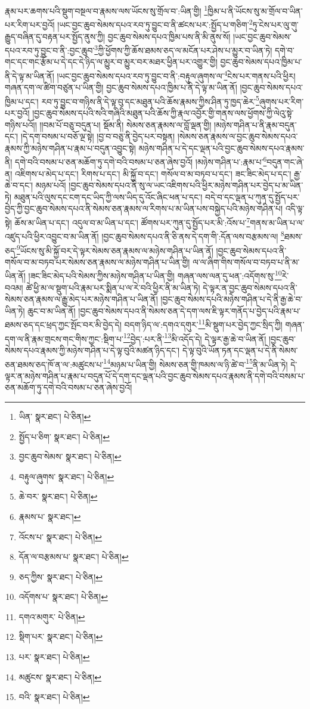 རྣམ་པར་ཆགས་པའི་སྡུག་བསྔལ་བ་རྣམས་ལས་ཡོངས་སུ་གྲོལ་བ་:ཡིན་གྱི། \footnote{ཡིན་  སྣར་ཐང་།  པེ་ཅིན། }ཁྱིམ་པ་ནི་ཡོངས་སུ་མ་གྲོལ་བ་ཡིན་པར་རིག་པར་བྱའོ། །ཡང་བྱང་ཆུབ་སེམས་དཔའ་རབ་ཏུ་བྱུང་བ་ནི་ཚངས་པར་:སྤྱོད་པ་གཅིག་\footnote{སྤྱོད་པ་ཅིག་  སྣར་ཐང་།  པེ་ཅིན། }ཏུ་ངེས་པར་ལུ་གུ་རྒྱུད་བཞིན་དུ་བརྟན་པར་སྤྱོད་ནུས་ཀྱི། བྱང་ཆུབ་སེམས་དཔའ་ཁྱིམ་པས་ནི་མི་ནུས་སོ། །ཡང་བྱང་ཆུབ་སེམས་དཔའ་རབ་ཏུ་བྱུང་བ་ནི་:བྱང་ཆུབ་\footnote{བྱང་ཆུབ་སེམས་  སྣར་ཐང་།  པེ་ཅིན། }ཀྱི་ཕྱོགས་ཀྱི་ཆོས་ཐམས་ཅད་ལ་མངོན་པར་ཤེས་པ་མྱུར་བ་ཡིན་ཏེ། དགེ་བ་གང་དང་གང་རྩོམ་པ་དེ་དང་དེ་ཉིད་ལ་མྱུར་བ་མྱུར་བར་མཐར་ཕྱིན་པར་འགྱུར་གྱི། བྱང་ཆུབ་སེམས་དཔའ་ཁྱིམ་པ་ནི་དེ་ལྟ་མ་ཡིན་ནོ། །ཡང་བྱང་ཆུབ་སེམས་དཔའ་རབ་ཏུ་བྱུང་བ་ནི་:བརྟུལ་ཞུགས་ལ་\footnote{བརྟུལ་ཞུགས་  སྣར་ཐང་།  པེ་ཅིན། }ངེས་པར་གནས་པའི་ཕྱིར། གཞན་དག་ལ་ཚིག་བཙུན་པ་ཡིན་གྱི། བྱང་ཆུབ་སེམས་དཔའ་ཁྱིམ་པ་ནི་དེ་ལྟ་མ་ཡིན་ནོ། །བྱང་ཆུབ་སེམས་དཔའ་ཁྱིམ་པ་དང་། རབ་ཏུ་བྱུང་བ་གཉིས་ནི་དེ་ལྟ་བུ་དང་མཐུན་པའི་ཆོས་རྣམས་ཀྱིས་ཤིན་ཏུ་ཁྱད་ཆེར་\footnote{ཆེ་བར་  སྣར་ཐང་།  པེ་ཅིན། }ཞུགས་པར་རིག་པར་བྱའོ། །བྱང་ཆུབ་སེམས་དཔའི་སའི་གཞིའི་མཐུན་པའི་ཆོས་ཀྱི་རྣལ་འབྱོར་གྱི་གནས་ལས་ཕྱོགས་ཀྱི་ལེའུ་སྟེ་གཉིས་པའོ།། །།བམ་པོ་བཅུ་བདུན་པ། སྡོམ་ནི། སེམས་ཅན་རྣམས་ལ་བློ་ལྡན་གྱི། །མཉེས་གཤིན་པ་ནི་རྣམ་བདུན་དང་། །དེ་དག་བསམ་པ་བཅོ་ལྔ་སྟེ། །བྱ་བ་བཅུ་ནི་བྱེད་པར་བསྟན། །སེམས་ཅན་རྣམས་ལ་བྱང་ཆུབ་སེམས་དཔའ་རྣམས་ཀྱི་མཉེས་གཤིན་པ་རྣམ་པ་བདུན་འབྱུང་སྟེ། མཉེས་གཤིན་པ་དེ་དང་ལྡན་པའི་བྱང་ཆུབ་སེམས་དཔའ་རྣམས་ནི། དགེ་བའི་བསམ་པ་ཅན་མཆོག་ཏུ་དགེ་བའི་བསམ་པ་ཅན་ཞེས་བྱའོ། །མཉེས་གཤིན་པ་:རྣམ་པ་\footnote{རྣམས་པ་  སྣར་ཐང་། }བདུན་གང་ཞེ་ན། འཇིགས་པ་མེད་པ་དང་། རིགས་པ་དང་། མི་སྐྱོ་བ་དང་། གསོལ་བ་མ་བཏབ་པ་དང་། ཟང་ཟིང་མེད་པ་དང་། རྒྱ་ཆེ་བ་དང་། མཉམ་པའོ། །བྱང་ཆུབ་སེམས་དཔའ་ནི་སུ་ལ་ཡང་འཇིགས་པའི་ཕྱིར་མཉེས་གཤིན་པར་བྱེད་པ་མ་ཡིན་ཏེ། མཐུན་པའི་ལུས་དང་ངག་དང་ཡིད་ཀྱི་ལས་ཡིད་དུ་འོང་ཞིང་ཕན་པ་དང་། བདེ་བ་དང་ལྡན་པ་ཀུན་དུ་སྤྱོད་པར་བྱེད་ཀྱི་བྱང་ཆུབ་སེམས་དཔའ་ནི་སེམས་ཅན་རྣམས་ལ་རིགས་པ་མ་ཡིན་པས་བསྐྱེད་པའི་མཉེས་གཤིན་པ། འདི་ལྟ་སྟེ། ཆོས་མ་ཡིན་པ་དང་། འདུལ་བ་མ་ཡིན་པ་དང་། ཚོགས་པར་ཀུན་དུ་སྤྱོད་པར་མི་:འོས་པ་\footnote{འོངས་པ་  སྣར་ཐང་།  པེ་ཅིན། }གནས་མ་ཡིན་པ་ལ་འཛུད་པའི་ཕྱིར་འབྱུང་བ་མ་ཡིན་ནོ། །བྱང་ཆུབ་སེམས་དཔའ་ནི་ཅི་ནས་དེ་དག་གི་:དོན་ལས་བརྩམས་ལ། \footnote{དོན་ལ་བརྩམས་པ་  སྣར་ཐང་།  པེ་ཅིན། }ཐམས་ཅད་\footnote{ཅད་ཀྱིས་  སྣར་ཐང་།  པེ་ཅིན། }ཡོངས་སུ་མི་སྐྱོ་བར་དེ་ལྟར་སེམས་ཅན་རྣམས་ལ་མཉེས་གཤིན་པ་ཡིན་ནོ། །བྱང་ཆུབ་སེམས་དཔའ་ནི་གསོལ་བ་མ་བཏབ་པར་སེམས་ཅན་རྣམས་ལ་མཉེས་གཤིན་པ་ཡིན་གྱི། ལ་ལ་ཞིག་གིས་གསོལ་བ་བཏབ་པ་ནི་མ་ཡིན་ནོ། །ཟང་ཟིང་མེད་པའི་སེམས་ཀྱིས་མཉེས་གཤིན་པ་ཡིན་གྱི། གཞན་ལས་ལན་དུ་ཕན་:འདོགས་སུ་\footnote{འདོགས་པ་  སྣར་ཐང་།  པེ་ཅིན། }རེ་བའམ། ཚེ་ཕྱི་མ་ལ་སྡུག་པའི་རྣམ་པར་སྨིན་པ་ལ་རེ་བའི་ཕྱིར་ནི་མ་ཡིན་ཏེ། དེ་ལྟར་ན་བྱང་ཆུབ་སེམས་དཔའ་ནི་སེམས་ཅན་རྣམས་ལ་རྒྱུ་མེད་པར་མཉེས་གཤིན་པ་ཡིན་ནོ། །བྱང་ཆུབ་སེམས་དཔའི་མཉེས་གཤིན་པ་དེ་ནི་རྒྱ་ཆེ་བ་ཡིན་ཏེ། ཆུང་བ་མ་ཡིན་ནོ། །བྱང་ཆུབ་སེམས་དཔའ་ནི་སེམས་ཅན་དེ་དག་ལས་ཇི་ལྟར་གནོད་པ་བྱེད་པའི་རྣམ་པ་ཐམས་ཅད་དང་ཕྲད་ཀྱང་སྤོང་བར་མི་བྱེད་དེ། བདག་ཉིད་ལ་:དགའ་དགུར་\footnote{དགའ་མགུར་  པེ་ཅིན། }མི་སྡུག་པར་བྱེད་ཀྱང་སྲིད་ཀྱི། གཞན་དག་ལ་ནི་རྣམ་གྲངས་གང་གིས་ཀྱང་:སྡིག་པ་\footnote{སྡིག་པར་  སྣར་ཐང་།  པེ་ཅིན། }བྱེད་:པར་ནི་\footnote{པར་  སྣར་ཐང་།  པེ་ཅིན། }མི་འདོད་དེ། དེ་ལྟར་རྒྱ་ཆེ་བ་ཡིན་ནོ། །བྱང་ཆུབ་སེམས་དཔའ་རྣམས་ཀྱི་མཉེས་གཤིན་པ་དེ་ལྟ་བུའི་མཚན་ཉིད་དང་། དེ་ལྟ་བུའི་ཡོན་ཏན་དང་ལྡན་པ་དེ་ནི་སེམས་ཅན་ཐམས་ཅད་ཁོ་ན་ལ་:མཚུངས་པ་\footnote{མཚུངས་  སྣར་ཐང་།  པེ་ཅིན། }མཉམ་པ་ཡིན་གྱི། སེམས་ཅན་གྱི་ཁམས་ལ་ཉི་ཚེ་བ་\footnote{བའི་  སྣར་ཐང་།  པེ་ཅིན། }ནི་མ་ཡིན་ཏེ། དེ་ལྟར་ན་མཉེས་གཤིན་པ་རྣམ་པ་བདུན་པོ་དེ་དག་དང་ལྡན་པའི་བྱང་ཆུབ་སེམས་དཔའ་རྣམས་ནི་དགེ་བའི་བསམ་པ་ཅན་མཆོག་ཏུ་དགེ་བའི་བསམ་པ་ཅན་ཞེས་བྱའོ། 